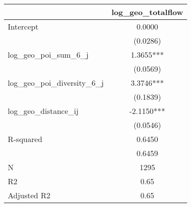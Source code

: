 \begin{table}
\caption{}
\begin{center}
\begin{tabular}{lc}
\hline
                               & log\_geo\_totalflow  \\
\midrule
Intercept                      & 0.0000               \\
                               & (0.0286)             \\
log\_geo\_poi\_sum\_6\_j       & 1.3655***            \\
                               & (0.0569)             \\
log\_geo\_poi\_diversity\_6\_j & 3.3746***            \\
                               & (0.1839)             \\
log\_geo\_distance\_ij         & -2.1150***           \\
                               & (0.0546)             \\
R-squared                      & 0.6450               \\
                               & 0.6459               \\
N                              & 1295                 \\
R2                             & 0.65                 \\
Adjusted R2                    & 0.65                 \\
\hline
\end{tabular}
\end{center}
\end{table}